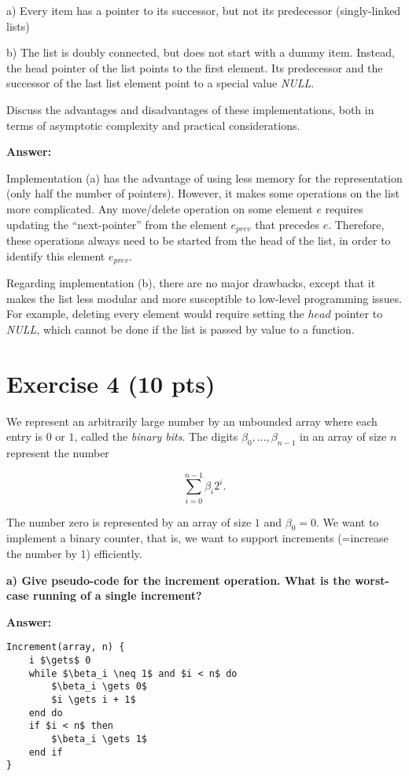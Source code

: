 \documentclass[a4paper]{article}
\begin{document}
a) Every item has a pointer to its successor, but not its predecessor (singly-linked lists)

b) The list is doubly connected, but does not start with a dummy item. Instead, the head
pointer of the list points to the first element. Its predecessor and the successor of the last list element point to a special value \emph{NULL}.

\bigskip Discuss the advantages and disadvantages of these implementations, both in terms of asymptotic complexity and practical considerations.

\bigskip \noindent \textbf{Answer:}

Implementation (a) has the advantage of using less memory for the representation (only half the number of pointers). However, it makes some operations on the list more complicated. Any move/delete operation on some element $e$ requires updating the ``next-pointer'' from the element $e_{prev}$ that precedes $e$. Therefore, these operations always need to be started from the head of the list, in order to identify this element $e_{prev}$.

Regarding implementation (b), there are no major drawbacks, except that it makes the list less modular and more susceptible to low-level programming issues. For example, deleting every element would require setting the $head$ pointer to \emph{NULL}, which cannot be done if the list is passed by value to a function.

\section{Exercise 4 (10 pts)}

We represent an arbitrarily large number by an unbounded array where each entry is $0$ or $1$, called the \emph{binary bits}. The digits $\beta_0, \ldots, \beta_{n-1}$ in an array of size $n$ represent the number

$$\sum\limits_{i=0}^{n-1} \beta_i 2^i.$$

\noindent The number zero is represented by an array of size $1$ and $\beta_0 = 0$. We want to implement a binary counter, that is, we want to support increments (=increase the number by 1) efficiently.

\noindent \textbf{a) Give pseudo-code for the increment operation. What is the worst-case running of a single increment?}

\bigskip \noindent \textbf{Answer:}

\begin{lstlisting}[mathescape]
Increment(array, n) {
    i $\gets$ 0
    while $\beta_i \neq 1$ and $i < n$ do
        $\beta_i \gets 0$
        $i \gets i + 1$
    end do
    if $i < n$ then
        $\beta_i \gets 1$
    end if
}
\end{lstlisting}
\end{document}
